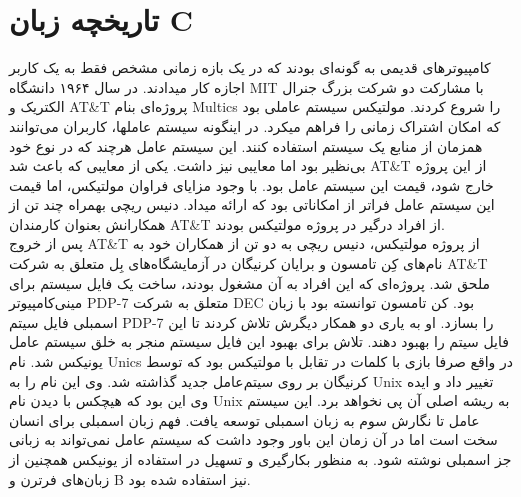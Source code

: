 \chapter{تاریخچه زبان C}
کامپیوترهای قدیمی به گونه‌ای بودند که در یک بازه زمانی مشخص فقط به یک کاربر اجازه کار میدادند. در سال ۱۹۶۴ دانشگاه MIT با مشارکت دو شرکت بزرگ جنرال الکتریک و AT\&T پروژه‌ای بنام Multics را شروع کردند. مولتیکس سیستم عاملی بود که امکان اشتراک زمانی را فراهم میکرد. در اینگونه سیستم عاملها، کاربران می‌توانند همزمان از منابع یک سیستم استفاده کنند. این سیستم عامل هرچند که در نوع خود بی‌نظیر بود اما معایبی نیز داشت. یکی از معایبی که باعث شد AT\&T از این پروژه خارج شود، قیمت این سیستم عامل بود. با وجود مزایای فراوان مولتیکس، اما قیمت این سیستم عامل فراتر از امکاناتی بود که ارائه میداد. دنیس ریچی بهمراه چند تن از همکارانش بعنوان کارمندان AT\&T از افراد درگیر در پروژه مولتیکس بودند.\\پس از خروج AT\&T از پروژه مولتیکس،‌ دنیس ریچی به دو تن از همکاران خود به نام‌های کِن تامسون و برایان کرنیگان در آزمایشگاه‌های بِل متعلق به شرکت AT\&T ملحق شد. پروژه‌ای که این افراد به آن مشغول بودند، ساخت یک فایل سیستم  برای مینی‌کامپیوتر PDP-7 متعلق به شرکت DEC بود. کن تامسون توانسته بود با زبان اسمبلی فایل سیتم PDP-7 را بسازد. او به یاری دو همکار دیگرش تلاش کردند تا این فایل سیتم را بهبود دهند. تلاش برای بهبود این فایل سیستم منجر به خلق سیستم عامل یونیکس شد. نام Unics در واقع صرفا بازی با کلمات در تقابل با مولتیکس بود که توسط کرنیگان بر روی سیتم‌عامل جدید گذاشته شد. وی این نام را به Unix تغییر داد و ایده وی این بود که هیچکس با دیدن نام Unix به ریشه اصلی آن پی نخواهد برد. این سیستم عامل تا نگارش سوم به زبان اسمبلی توسعه یافت. فهم زبان اسمبلی برای انسان سخت است اما در آن زمان این باور وجود داشت که سیستم عامل نمی‌تواند به زبانی جز اسمبلی نوشته شود. به منظور بکارگیری و تسهیل در استفاده از یونیکس همچنین از زبان‌های فرترن و B نیز استفاده شده بود.

